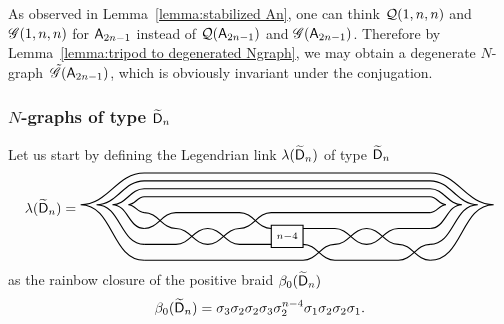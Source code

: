 \begin{remark}\label{remark:degenerated Ngraph of type A}
As observed in Lemma~\ref{lemma:stabilized An}, one can think $\mathcal{Q}(1,n,n)$ and $\mathscr{G}(1,n,n)$ for $\mathsf{A}_{2n-1}$ instead of $\mathcal{Q}(\mathsf{A}_{2n-1})$ and $\mathscr{G}(\mathsf{A}_{2n-1})$. Therefore by Lemma~\ref{lemma:tripod to degenerated Ngraph}, we may obtain a degenerate $N$-graph~$\tilde{\mathscr{G}}(\mathsf{A}_{2n-1})$, which is obviously invariant under the conjugation.
\end{remark}



\subsubsection{\texorpdfstring{$N$-graphs}{N-graphs} of type \texorpdfstring{$\widetilde{\mathsf{D}}_n$}{affine Dn}}
Let us start by defining the Legendrian link $\lambda(\widetilde{\mathsf{D}}_n)$ of type $\widetilde{\mathsf{D}}_n$
\begin{align*}
\legendrian({\exdynD}_n)=
\begin{tikzpicture}[baseline=0ex,scale=0.8]
\draw[thick] (0,0) to[out=0,in=180] (1,-0.5) to[out=0,in=180] (2,-1) to[out=0,in=180] (3,-0.5) to[out=0,in=180] (4,0) to[out=0,in=180] (9,0);
\draw[thick] (0,-0.5) to[out=0,in=180] (1,0) to[out=0,in=180] (3,0) to[out=0,in=180] (4,-0.5) (5,-0.5) to[out=0,in=180] (6,-0.5) to[out=0,in=180] (7,-1) to[out=0,in=180] (8,-0.5) to[out=0,in=180] (9,-0.5);
\draw[thick] (0,-1) to[out=0,in=180] (1,-1) to[out=0,in=180] (2,-0.5) to[out=0,in=180] (3,-1) to[out=0,in=180] (4,-1) (5,-1) to[out=0,in=180] (6,-1.5) to[out=0,in=180] (8,-1.5) to[out=0,in=180] (9,-1);
\draw[thick] (0,-1.5) to[out=0,in=180] (5,-1.5) to[out=0,in=180] (6,-1) to[out=0,in=180] (7,-0.5) to[out=0,in=180] (8,-1) to[out=0,in=180] (9,-1.5);
\draw[thick] (4,-0.4) rectangle node {$\scriptstyle{n-4}$} (5, -1.1);
\draw[thick] (0,0) to[out=180,in=0] (-0.5,0.25) to[out=0,in=180] (0,0.5) to[out=0,in=180] (9,0.5) to[out=0,in=180] (9.5,0.25) to[out=180,in=0] (9,0);
\draw[thick] (0,-0.5) to[out=180,in=0] (-1,0.25) to[out=0,in=180] (0,0.75) to[out=0,in=180] (9,0.75) to[out=0,in=180] (10,0.25) to[out=180,in=0] (9,-0.5);
\draw[thick] (0,-1) to[out=180,in=0] (-1.5,0.25) to[out=0,in=180] (0,1) to[out=0,in=180] (9,1) to[out=0,in=180] (10.5,0.25) to[out=180,in=0] (9,-1);
\draw[thick] (0,-1.5) to[out=180,in=0] (-2,0.25) to[out=0,in=180] (0,1.25) to[out=0,in=180] (9,1.25) to[out=0,in=180] (11,0.25) to[out=180,in=0] (9,-1.5);
\end{tikzpicture}
\end{align*}
as the rainbow closure of the positive braid $\beta_0(\widetilde{\mathsf{D}}_n)$
\[
\beta_0({\widetilde{\mathsf{D}}}_n)=\sigma_3\sigma_2\sigma_2\sigma_3 \sigma_2^{n-4} \sigma_1 \sigma_2 \sigma_2 \sigma_1.
\]

